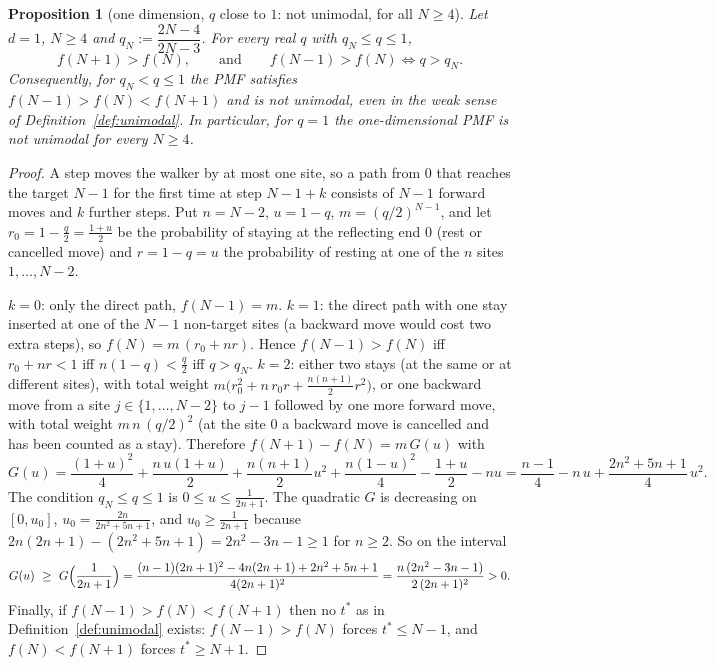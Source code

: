 \documentclass[11pt,a4paper]{article}
\newtheorem{proposition}[theorem]{Proposition}
\theoremstyle{definition}
\theoremstyle{remark}
\begin{document}
\begin{proposition}[one dimension, $q$ close to $1$: not unimodal, for all $N\ge4$]\label{prop:notunimodal}
Let $d=1$, $N\ge4$ and $q_N:=\dfrac{2N-4}{2N-3}$. For every real $q$ with $q_N\le q\le1$,
\[
f(N+1)>f(N),\qquad\text{and}\qquad f(N-1)>f(N)\iff q>q_N .
\]
Consequently, for $q_N<q\le1$ the PMF satisfies $f(N-1)>f(N)<f(N+1)$ and is not unimodal, even in the weak sense of Definition~\ref{def:unimodal}. In particular, for $q=1$ the one-dimensional PMF is not unimodal for \emph{every} $N\ge4$.
\end{proposition}
\begin{proof}
A step moves the walker by at most one site, so a path from $0$ that reaches the target $N-1$ for the first time at step $N-1+k$ consists of $N-1$ forward moves and $k$ further steps. Put $n=N-2$, $u=1-q$, $m=(q/2)^{N-1}$, and let $r_0=1-\frac q2=\frac{1+u}2$ be the probability of staying at the reflecting end $0$ (rest or cancelled move) and $r=1-q=u$ the probability of resting at one of the $n$ sites $1,\dots,N-2$.

$k=0$: only the direct path, $f(N-1)=m$. $k=1$: the direct path with one stay inserted at one of the $N-1$ non-target sites (a backward move would cost two extra steps), so $f(N)=m\,(r_0+nr)$. Hence $f(N-1)>f(N)$ iff $r_0+nr<1$ iff $n(1-q)<\frac q2$ iff $q>q_N$. $k=2$: either two stays (at the same or at different sites), with total weight $m\bigl(r_0^2+n\,r_0r+\tfrac{n(n+1)}2r^2\bigr)$, or one backward move from a site $j\in\{1,\dots,N-2\}$ to $j-1$ followed by one more forward move, with total weight $m\,n\,(q/2)^2$ (at the site $0$ a backward move is cancelled and has been counted as a stay). Therefore $f(N+1)-f(N)=m\,G(u)$ with
\[
G(u)=\frac{(1+u)^2}4+\frac{n\,u(1+u)}2+\frac{n(n+1)}2u^2+\frac{n(1-u)^2}4-\frac{1+u}2-nu
=\frac{n-1}4-n\,u+\frac{2n^2+5n+1}4\,u^2 .
\]
The condition $q_N\le q\le1$ is $0\le u\le\frac1{2n+1}$. The quadratic $G$ is decreasing on $[0,u_0]$, $u_0=\frac{2n}{2n^2+5n+1}$, and $u_0\ge\frac1{2n+1}$ because $2n(2n+1)-(2n^2+5n+1)=2n^2-3n-1\ge1$ for $n\ge2$. So on the interval
\[
G(u)\ \ge\ G\Bigl(\frac1{2n+1}\Bigr)=\frac{(n-1)(2n+1)^2-4n(2n+1)+2n^2+5n+1}{4(2n+1)^2}=\frac{n\,(2n^2-3n-1)}{2\,(2n+1)^2}>0 .
\]
Finally, if $f(N-1)>f(N)<f(N+1)$ then no $t^*$ as in Definition~\ref{def:unimodal} exists: $f(N-1)>f(N)$ forces $t^*\le N-1$, and $f(N)<f(N+1)$ forces $t^*\ge N+1$.
\end{proof}
\end{document}
